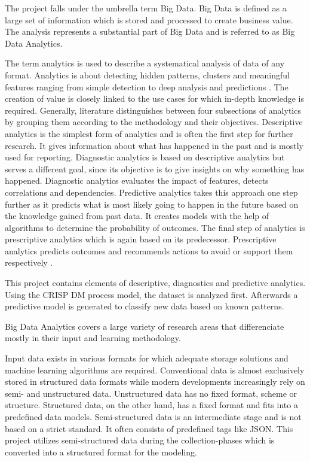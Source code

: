 The project falls under the umbrella term Big Data. Big Data is defined as a large set of information
which is stored and processed to create business value. The analysis represents a substantial part of Big Data and is 
referred to as Big Data Analytics. 

The term analytics is used to describe a systematical analysis of data of any format. Analytics is 
about detecting hidden patterns, clusters and meaningful features ranging from simple detection 
to deep analysis and predictions \cite[p.2]{Tanwar2015} \cite[p.8f]{Meier_2021}.
The creation of value is closely linked to 
the use cases for which in-depth knowledge is required. Generally, literature distinguishes 
between four subsections of analytics by grouping them according to the methodology 
and their objectives. Descriptive analytics is the simplest 
form of analytics and is often the first step for further research. It gives 
information about what has happened in the past and is mostly used for reporting. Diagnostic analytics is based on descriptive 
analytics but serves a different goal, since its objective is to give insights on why something has 
happened. Diagnostic analytics evaluates the impact of features, detects correlations 
and dependencies. Predictive analytics takes this approach one step further as it predicts what 
is most likely going to happen in the future based on the knowledge gained from past data. It 
creates models with the help of algorithms to determine the probability of outcomes. The final 
step of analytics is prescriptive analytics which is again based on its predecessor. Prescriptive 
analytics predicts outcomes and recommends actions to avoid or support them respectively \cite[p.8f]{Meier_2021}.

This project contains elements of descriptive, diagnostics and predictive analytics. Using the 
\ac{CRISP DM} process model, the dataset is analyzed first. Afterwards a predictive model 
is generated to classify new data based on known patterns.

Big Data Analytics covers a large variety of research areas that differenciate mostly in their input
and learning methodology. 

Input data exists in various formats for which adequate storage solutions and machine learning 
algorithms are required. Conventional data is almost exclusively stored in structured data formats 
while modern developments increasingly rely on semi- and unstructured data. Unstructured data has no
fixed format, scheme or structure. Structured data, on the other hand, has a fixed format and fits into 
a predefined data models. Semi-structured data is an intermediate stage and is not based on a strict
standard. It often consists of predefined tags like \ac{JSON}. This project utilizes semi-structured 
data during the collection-phases which is converted into a structured format for the modeling.

